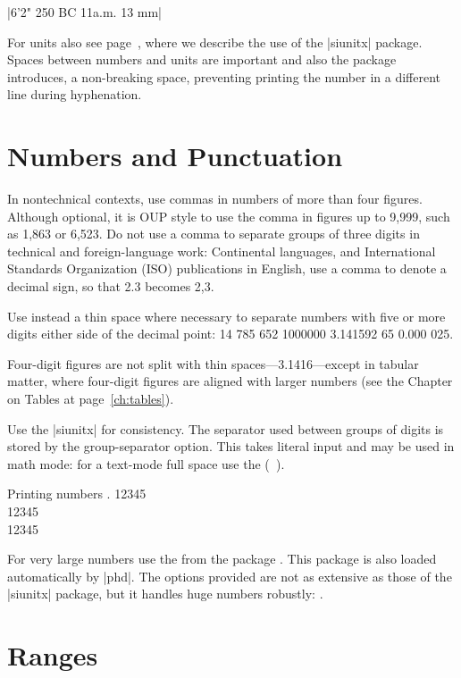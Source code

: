 |6'2" 250 BC 11a.m. 13 mm|

For units also see page~\pageref{units}, where we describe the use of the |siunitx| package. Spaces between numbers and units are important and also the package introduces, a non-breaking space, preventing printing the number in a different line during hyphenation.

\section{Numbers and Punctuation}

In nontechnical contexts, use commas in numbers of more than four
figures. Although optional, it is OUP style to use the comma in figures up
to 9,999, such as 1,863 or 6,523. Do not use a comma to separate groups of
three digits in technical and foreign-language work:
Continental languages,
and International Standards Organization (ISO) publications in
English, use a comma to denote a decimal sign, so that 2.3 becomes 2,3.

Use instead a thin space where necessary to separate numbers with five
or more digits either side of the decimal point:
14 785 652 1000000 3.141592 65 0.000 025.

Four-digit figures are not split with thin spaces—3.1416—except in
tabular matter, where four-digit figures are aligned with larger numbers (see the Chapter on Tables at page~\ref{ch:tables}).

Use the |siunitx| for consistency. The separator used between groups of digits is stored by the group-separator option.
This takes literal input and may be used in math mode: for a text-mode full space use the (\texttt{~}).

\begin{texexample}{Printing numbers}{}
\text{~}.
\num{12345} \\
\num[group-separator = {,}]{12345} \\
\num[group-separator = \text{~}]{12345}
\end{texexample}

For very large numbers use the \cmd{\numprint} from the  package \citep{numprint}. This package is also loaded automatically by |phd|. The options provided are not as extensive as those of the |siunitx| package, but it handles huge numbers robustly: . 

\section{Ranges}

